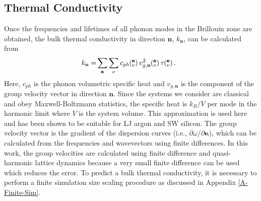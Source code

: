\documentclass[letterpaper,12pt]{article}
\newcommand{\kv}{\mspace{-4.0mu}\left(\mspace{-8.0mu}\begin{smallmatrix}&\pmb{\kappa} \\&\nu\end{smallmatrix}\mspace{-3.0mu}\right)}
\begin{document}
\subsection{\label{A-Thermal-Cond}Thermal Conductivity}
Once the frequencies and lifetimes of all phonon modes in the
Brillouin zone are obtained, the bulk thermal conductivity in direction
$\mathbf{n}$, $k_{\mathbf{n}}$, can be calculated from \cite{ziman2001}
\begin{equation}\label{E-size:k_bulk}\
\begin{split}
k_{\mathbf{n}}=&\sum_{\pmb{\kappa}} \sum_\nu c_{ph} \kv v^{2}_{g,\mathbf{n}} \kv \tau \kv.
\end{split}
\end{equation}
Here, $c_{ph}$ is the phonon volumetric specific heat and ${v}_{g,\mathbf{n}}$ is
the component of the group velocity vector in direction $\mathbf{n}$. Since the systems we consider are classical and obey Maxwell-Boltzmann statistics,\cite{mcquarrie2000} the
specific heat is $k_{B}/V$ per mode in the harmonic limit where $V$ is the system volume. This approximation is used here and has been shown to be suitable for LJ argon\cite{mcgaughey2004c} and SW silicon.\cite{goicochea2010} The group
velocity vector is the gradient of the dispersion curves (i.e., $\partial \omega / \partial \pmb{\kappa}$), which can be calculated from the frequencies and wavevectors using finite differences. In this work, the group velocities are calculated using finite difference and quasi-harmonic lattice dynamics because a very small finite difference can be used which reduces the error.\cite{mcgaughey2006b} To predict a bulk thermal conductivity, it is necessary to perform a finite simulation size scaling procedure as discussed in Appendix \ref{A-Finite-Sim}.
\end{document}
